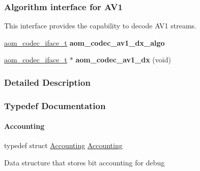 \subsubsection*{Algorithm interface for A\+V1}
\label{_amgrp8c574bd9a585a04008b0d15257056884}%
This interface provides the capability to decode A\+V1 streams. \begin{DoxyCompactItemize}
\item 
\mbox{\label{group__aom__decoder_ga3747f3c9af0ff0dfc68196b00efd7771}} 
\hyperlink{group__codec_ga4ef55b44c762836d1550e11921bed403}{aom\+\_\+codec\+\_\+iface\+\_\+t} {\bfseries aom\+\_\+codec\+\_\+av1\+\_\+dx\+\_\+algo}
\item 
\mbox{\label{group__aom__decoder_gac1531da8eff42fd25462c95a450f0c4f}} 
\hyperlink{group__codec_ga4ef55b44c762836d1550e11921bed403}{aom\+\_\+codec\+\_\+iface\+\_\+t} $\ast$ {\bfseries aom\+\_\+codec\+\_\+av1\+\_\+dx} (void)
\end{DoxyCompactItemize}


\subsubsection{Detailed Description}


\subsubsection{Typedef Documentation}
\mbox{\label{group__aom__decoder_ga4e755ba2db79154311994183ad9e4b28}} 
\paragraph{\texorpdfstring{Accounting}{Accounting}}
{\footnotesize\ttfamily typedef struct \hyperlink{group__aom__decoder_ga4e755ba2db79154311994183ad9e4b28}{Accounting} \hyperlink{group__aom__decoder_ga4e755ba2db79154311994183ad9e4b28}{Accounting}}

Data structure that stores bit accounting for debug \mbox{\label{group__aom__decoder_ga1b37b4b76004e5a2776c2e2f16b052cd}} 
